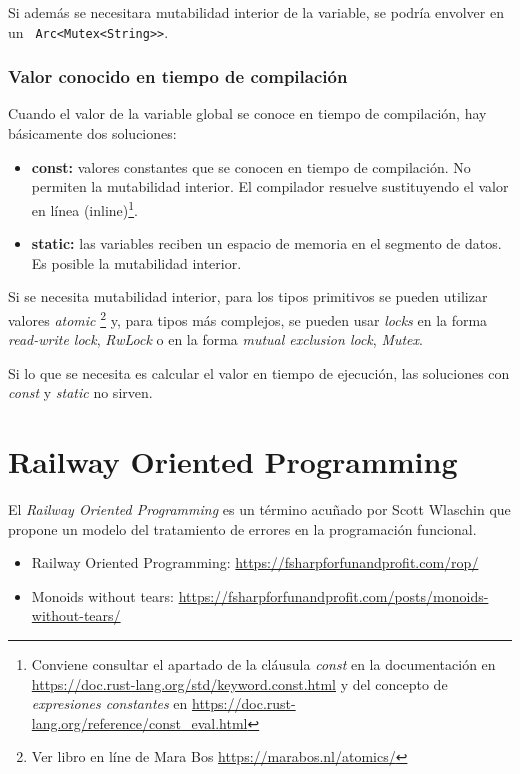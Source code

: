 Si además se necesitara mutabilidad interior de la variable, se podría envolver en un \verb+ Arc<Mutex<String>>+.

\subsection{Valor conocido en tiempo de compilación}
\noindent Cuando el valor de la variable global se conoce en tiempo de compilación, hay básicamente dos soluciones:
\begin{itemize}
   \item \textbf{const:} valores constantes que se conocen en tiempo de compilación. No permiten la mutabilidad interior. El compilador resuelve sustituyendo el valor en línea (inline)\footnote{Conviene consultar el apartado de la cláusula \textit{const} en la documentación en  \url{https://doc.rust-lang.org/std/keyword.const.html} y del concepto de \textit{expresiones constantes} en \url{https://doc.rust-lang.org/reference/const_eval.html}}. 
   \item \textbf{static:} las variables reciben un espacio de memoria en el segmento de datos. Es posible la mutabilidad interior.
\end{itemize}

Si se necesita mutabilidad interior, para los tipos primitivos se pueden utilizar valores \textit{atomic} \footnote{Ver libro en líne de Mara Bos \url{https://marabos.nl/atomics/}} y, para tipos más complejos, se pueden usar \textit{locks} en la forma \textit{read-write lock}, \textit{RwLock} o en la forma \textit{mutual exclusion lock}, \textit{Mutex}. 

Si lo que se necesita es calcular el valor en tiempo de ejecución, las soluciones con \textit{const} y \textit{static} no sirven.

\chapter{Railway Oriented Programming}

El \textit{Railway Oriented Programming} es un término acuñado por Scott Wlaschin que propone un modelo del tratamiento de errores en la programación funcional.

\begin{itemize}
   \item Railway Oriented Programming: \url{https://fsharpforfunandprofit.com/rop/}
   \item Monoids without tears: \url{https://fsharpforfunandprofit.com/posts/monoids-without-tears/}
\end{itemize}

